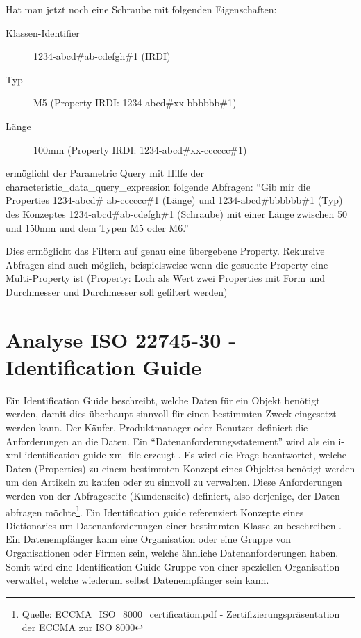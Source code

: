 Hat man jetzt noch eine Schraube mit folgenden Eigenschaften:
\begin{description}
\item[Klassen-Identifier] 1234-abcd\#ab-cdefgh\#1 (\gls{IRDI})
\item[Typ] M5 (Property IRDI: 1234-abcd\#xx-bbbbbb\#1)
\item[Länge] 100mm (Property \gls{IRDI}: 1234-abcd\#xx-cccccc\#1)
\end{description}

ermöglicht der Parametric Query mit Hilfe der characteristic\_data\_query\_expression folgende Abfragen:  \enquote{Gib mir die Properties 1234-abcd\# ab-cccccc\#1 (Länge) und 1234-abcd\#bbbbbb\#1 (Typ) des Konzeptes 1234-abcd\#ab-cdefgh\#1 (Schraube) mit einer Länge zwischen 50 und 150mm und dem Typen M5 oder M6.}

Dies ermöglicht das Filtern auf genau eine übergebene Property. Rekursive Abfragen sind auch möglich, beispielsweise wenn die gesuchte Property eine Multi-Property ist (Property: Loch als Wert zwei Properties mit Form und Durchmesser und Durchmesser soll gefiltert werden)

\section{Analyse ISO 22745-30 - Identification Guide}\label{kap:identification_guide_anhang}

Ein Identification Guide beschreibt, welche Daten für ein Objekt benötigt werden, damit dies überhaupt sinnvoll für einen bestimmten Zweck eingesetzt werden kann. Der Käufer, Produktmanager oder Benutzer definiert die Anforderungen an die Daten. Ein  \enquote{Datenanforderungsstatement} wird als ein i-xml identification guide xml file erzeugt \citep[vgl.][Slide 14 - Automating the Data Supply Chain]{bensonQuality}. Es wird die Frage beantwortet, welche Daten (Properties) zu einem bestimmten Konzept eines Objektes benötigt werden um den Artikeln zu kaufen oder zu sinnvoll zu verwalten. Diese Anforderungen werden von der Abfrageseite (Kundenseite) definiert, also derjenige, der Daten abfragen möchte\footnote{Quelle: ECCMA\_ISO\_8000\_certification.pdf - Zertifizierungspräsentation der ECCMA zur ISO 8000}.
Ein Identification guide referenziert Konzepte eines Dictionaries um Datenanforderungen einer bestimmten Klasse zu beschreiben \citep[vgl.][Kapitel 5]{iso22745-30}.  
Ein Datenempfänger kann eine Organisation oder eine Gruppe von Organisationen oder Firmen sein, welche ähnliche Datenanforderungen haben. Somit wird eine Identification Guide Gruppe von einer speziellen Organisation verwaltet, welche wiederum selbst Datenempfänger sein kann.  

